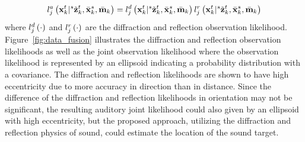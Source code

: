 \documentclass[letterpaper, 10 pt, conference]{ieeeconf}  %
\begin{document}
\begin{equation}\label{eq:joint_auditory}
l_j^{a} \left ( \mathbf{x}_{k}^{t}|{}^{s}\tilde {\mathbf{z}}_{k}^{t},\bar {\mathbf{x}}_{k}^{s},\bar {\mathbf{m}}_{k} \right ) = l_j^{d} \left ( \mathbf{x}_{k}^{t}|{}^{s}\tilde {\mathbf{z}}_{k}^{t},\bar {\mathbf{x}}_{k}^{s},\bar {\mathbf{m}}_{k} \right ) l_j^{r} \left ( \mathbf{x}_{k}^{t}|{}^{s}\tilde {\mathbf{z}}_{k}^{t},\bar {\mathbf{x}}_{k}^{s},\bar {\mathbf{m}}_{k} \right ) 
\end{equation}
where $l_j^{d} \left ( \cdot \right )$ and $l_j^{r} \left ( \cdot \right )$ are the diffraction and reflection observation likelihood.  
Figure~\ref{fig:data_fusion} illustrates the diffraction and reflection observation likelihoods as well as the joint observation likelihood where the observation likelihood is represented by an ellipsoid indicating a probability distribution with a covariance.  The diffraction and reflection likelihoods are shown to have high eccentricity due to more accuracy in direction than in distance.  Since the difference of the diffraction and reflection likelihoods in orientation may not be significant, the resulting auditory joint likelihood could also given by an ellipsoid with high eccentricity, but the proposed approach, utilizing the diffraction and reflection physics of sound, could estimate the location of the sound target.  
%
%
%
%   
\end{document}
